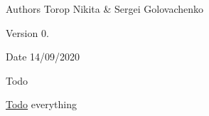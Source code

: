 \begin{DoxyAuthor}{Authors}
Torop Nikita \& Sergei Golovachenko 
\end{DoxyAuthor}
\begin{DoxyVersion}{Version}
0. 
\end{DoxyVersion}
\begin{DoxyDate}{Date}
14/09/2020 
\end{DoxyDate}
\begin{DoxyRefDesc}{Todo}
\item[\mbox{\hyperlink{todo__todo000001}{Todo}}]everything \end{DoxyRefDesc}
